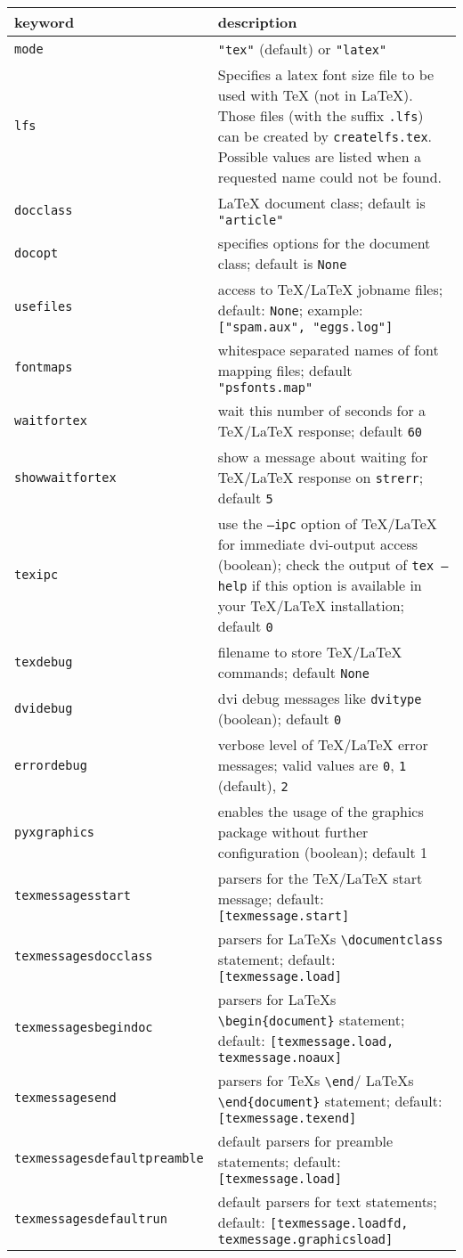 \medskip
\begin{tabularx}{\linewidth}{l>{\raggedright\arraybackslash}X}
keyword&description\\
\hline
\texttt{mode}&\texttt{"tex"} (default) or \texttt{"latex"}\\
\texttt{lfs}&Specifies a latex font size file to be used with \TeX{} (not in \LaTeX). Those files (with the suffix \texttt{.lfs}) can be created by \texttt{createlfs.tex}. Possible values are listed when a requested name could not be found.\\
\texttt{docclass}&\LaTeX{} document class; default is \texttt{"article"}\\
\texttt{docopt}&specifies options for the document class; default is \texttt{None}\\
\texttt{usefiles}&access to \TeX/\LaTeX{} jobname files; default: \texttt{None}; example: \texttt{["spam.aux", "eggs.log"]}\\
\texttt{fontmaps}&whitespace separated names of font mapping files; default \texttt{"psfonts.map"}\\
\texttt{waitfortex}&wait this number of seconds for a \TeX/\LaTeX{} response; default \texttt{60}\\
\texttt{showwaitfortex}&show a message about waiting for \TeX/\LaTeX{} response on \texttt{strerr}; default \texttt{5}\\
\texttt{texipc}&use the \texttt{--ipc} option of \TeX/\LaTeX{} for immediate dvi-output access (boolean); check the output of \texttt{tex --help} if this option is available in your \TeX/\LaTeX{} installation; default \texttt{0}\\
\texttt{texdebug}&filename to store \TeX/\LaTeX{} commands; default \texttt{None}\\
\texttt{dvidebug}&dvi debug messages like \texttt{dvitype} (boolean); default \texttt{0}\\
\texttt{errordebug}&verbose level of \TeX/\LaTeX{} error messages; valid values are \texttt{0}, \texttt{1} (default), \texttt{2}\\
\texttt{pyxgraphics}&enables the usage of the graphics package without further configuration (boolean); default 1\\
\texttt{texmessagesstart}&parsers for the \TeX/\LaTeX{} start message; default: \texttt{[texmessage.start]}\\
\texttt{texmessagesdocclass}&parsers for \LaTeX{}s \texttt{\textbackslash{}documentclass} statement; default: \texttt{[texmessage.load]}\\
\texttt{texmessagesbegindoc}&parsers for \LaTeX{}s \texttt{\textbackslash{}begin\{document\}} statement; default: \texttt{[texmessage.load, texmessage.noaux]}\\
\texttt{texmessagesend}&parsers for \TeX{}s \texttt{\textbackslash{}end}/ \LaTeX{}s \texttt{\textbackslash{}end\{document\}} statement; default: \texttt{[texmessage.texend]}\\
\texttt{texmessagesdefaultpreamble}&default parsers for preamble statements; default: \texttt{[texmessage.load]}\\
\texttt{texmessagesdefaultrun}&default parsers for text statements; default: \texttt{[texmessage.loadfd, texmessage.graphicsload]}\\
\end{tabularx}
